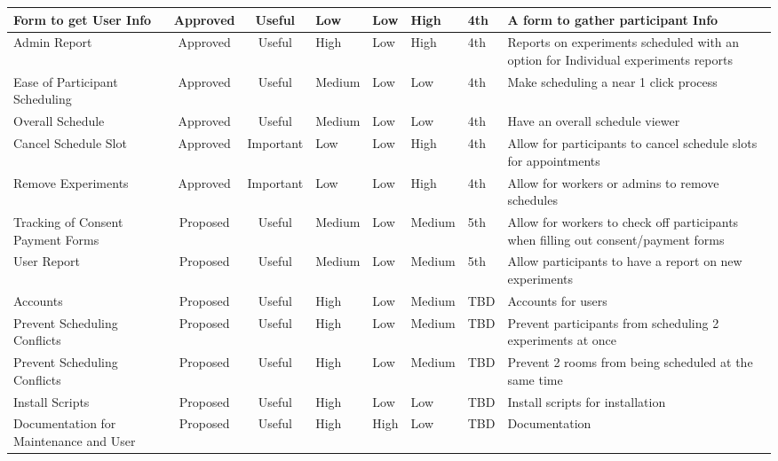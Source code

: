 \begin{table}[!h]
\begin{tabular}{|p{2.5cm}|c|c|p{1.25cm}|p{1cm}|p{1.25cm}|p{1cm}|p{3.75cm}|}
        \hline
        Form to get User Info & Approved & Useful & Low & Low & High & 4th & A form to gather participant Info \\
        \hline
        Admin Report & Approved & Useful & High & Low & High & 4th & Reports on experiments scheduled with an option for Individual experiments reports \\
        \hline
        Ease of Participant Scheduling & Approved & Useful & Medium & Low & Low & 4th & Make scheduling a near 1 click process \\
        \hline
        Overall Schedule & Approved & Useful & Medium & Low & Low & 4th & Have an overall schedule viewer \\
        \hline
        Cancel Schedule Slot & Approved & Important & Low & Low & High & 4th & Allow for participants to cancel schedule slots for appointments \\
        \hline
        Remove Experiments & Approved & Important & Low & Low & High & 4th & Allow for workers or admins to remove schedules \\
        \hline
        Tracking of Consent Payment Forms & Proposed & Useful & Medium & Low & Medium & 5th & Allow for workers to check off participants when filling out consent/payment forms \\
        \hline
        User Report & Proposed & Useful & Medium & Low & Medium & 5th & Allow participants to have a report on new experiments \\
        \hline
        Accounts & Proposed & Useful & High & Low & Medium & TBD & Accounts for users \\
        \hline
        Prevent Scheduling Conflicts & Proposed & Useful & High & Low & Medium & TBD & Prevent participants from scheduling 2 experiments at once \\
        \hline
        Prevent Scheduling Conflicts & Proposed & Useful & High & Low & Medium & TBD & Prevent 2 rooms from being scheduled at the same time \\
        \hline
        Install Scripts & Proposed & Useful & High & Low & Low & TBD & Install scripts for installation \\
        \hline
        Documentation for Maintenance and User & Proposed & Useful & High & High & Low & TBD & Documentation \\
        \hline
    \end{tabular}
\end{table}
\clearpage
